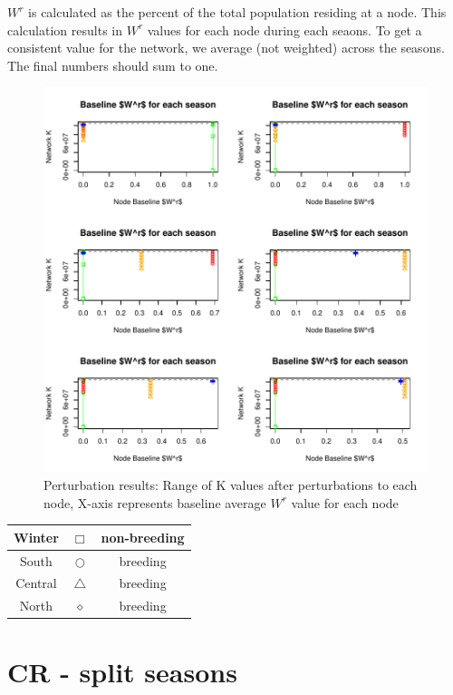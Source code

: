 \documentclass[10pt]{article}
\begin{document}
$W^r$ is calculated as the percent of the total population residing at a node. This calculation results in $W^r$ values for each node during each seaons. To get a consistent value for the network, we average (not weighted) across the seasons. The final numbers should sum to one.


\vspace{-.5cm}
\begin{figure}[H]
\begin{center}
\includegraphics[width=.8\textwidth, height=.8\textwidth]{RGraphics-monarch_barcr_WR}
\caption{Perturbation results: Range of K values after perturbations to each node, X-axis represents baseline average $W^r$ value for each node}\label{fig:monarch_barcr_WR}
\end{center}
\end{figure}

\vspace{-.5cm}
\begin{tabular}{|c|c|c|}
\hline
{\color{green}Winter} & $\Box$ & non-breeding \\
\hline
{\color{red}South} & $\bigcirc$ & breeding \\
\hline
{\color{orange}Central} & $\triangle$ & breeding \\
\hline
{\color{blue}North} & $\diamond$ & breeding \\
\hline
\end{tabular}

\section{CR - split seasons}
\end{document}
